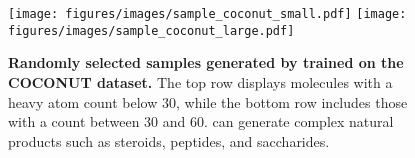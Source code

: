\begin{figure}[h!]
    \centering
    \texttt{[image: figures/images/sample\_coconut\_small.pdf]}
    \texttt{[image: figures/images/sample\_coconut\_large.pdf]}
    \caption{\textbf{Randomly selected samples generated by \methodname{} trained on the COCONUT dataset.}  The top row displays molecules with a heavy atom count below 30, while the bottom row includes those with a count between 30 and 60. \methodname{} can generate complex natural products such as steroids, peptides, and saccharides.}
    \label{fig:sample_coconut}
\end{figure}

